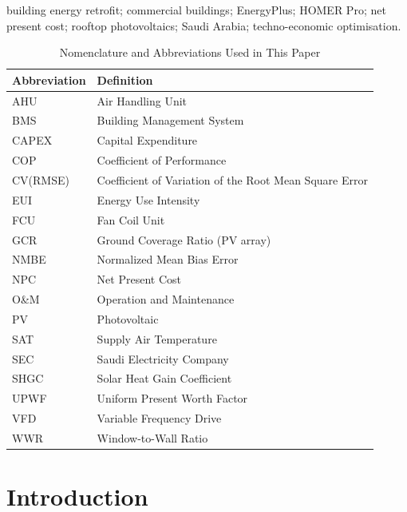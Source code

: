 \documentclass[journal,fleqn]{IEEEtran}
\renewcommand{\arraystretch}{1.08}
\begin{document}
\begin{IEEEkeywords}

building energy retrofit; commercial buildings; EnergyPlus; HOMER Pro; net present cost; rooftop photovoltaics; Saudi Arabia; techno-economic optimisation.

\end{IEEEkeywords}

\begin{table}[!t]
\caption{Nomenclature and Abbreviations Used in This Paper}
\label{tab:01}
\centering
\footnotesize
\setlength{\tabcolsep}{4pt}
\renewcommand{\arraystretch}{1.16}
\begin{tabularx}{\textwidth}{@{}>{\raggedright\arraybackslash}p{}>{\raggedright\arraybackslash}X@{}}
\toprule
\textbf{Abbreviation} & \textbf{Definition} \\
\midrule
AHU & Air Handling Unit \\
BMS & Building Management System \\
CAPEX & Capital Expenditure \\
COP & Coefficient of Performance \\
CV(RMSE) & Coefficient of Variation of the Root Mean Square Error \\
EUI & Energy Use Intensity \\
FCU & Fan Coil Unit \\
GCR & Ground Coverage Ratio (PV array) \\
NMBE & Normalized Mean Bias Error \\
NPC & Net Present Cost \\
O\&M & Operation and Maintenance \\
PV & Photovoltaic \\
SAT & Supply Air Temperature \\
SEC & Saudi Electricity Company \\
SHGC & Solar Heat Gain Coefficient \\
UPWF & Uniform Present Worth Factor \\
VFD & Variable Frequency Drive \\
WWR & Window-to-Wall Ratio \\
\bottomrule
\end{tabularx}
\end{table}

\section{Introduction}
\end{document}
